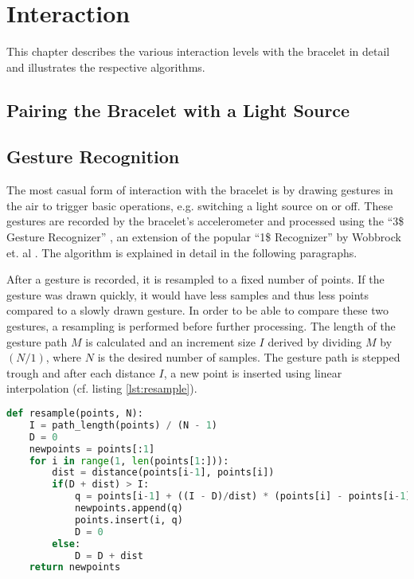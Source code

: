 \chapter{Interaction}

This chapter describes the various interaction levels with the bracelet in detail and illustrates the respective algorithms.

\section{Pairing the Bracelet with a Light Source}

\section{Gesture Recognition}
The most casual form of interaction with the bracelet is by drawing gestures in the air to trigger basic operations, e.g. switching a light source on or off. These gestures are recorded by the bracelet's accelerometer and processed using the ``3\$ Gesture Recognizer'' \cite{Kratz2010}, an extension of the popular ``1\$ Recognizer'' by Wobbrock et. al \cite{Wobbrock2007}. The algorithm is explained in detail in the following paragraphs.

After a gesture is recorded, it is resampled to a fixed number of points. If the gesture was drawn quickly, it would have less samples and thus less points compared to a slowly drawn gesture. In order to be able to compare these two gestures, a resampling is performed before further processing. The length of the gesture path $M$ is calculated and an increment size $I$ derived by dividing $M$ by $(N/1)$, where $N$ is the desired number of samples. The gesture path is stepped trough and after each distance $I$, a new point is inserted using linear interpolation (cf. listing \ref{lst:resample}).

\begin{lstlisting}[label=lst:resample,language=python,frame=lt,caption=Resampling of a points path into N evenly spaced points]
def resample(points, N):
	I = path_length(points) / (N - 1)
	D = 0
	newpoints = points[:1]
	for i in range(1, len(points[1:])):
		dist = distance(points[i-1], points[i])
		if(D + dist) > I:
			q = points[i-1] + ((I - D)/dist) * (points[i] - points[i-1])
			newpoints.append(q)
			points.insert(i, q)
			D = 0
		else:
			D = D + dist
	return newpoints
\end{lstlisting}

